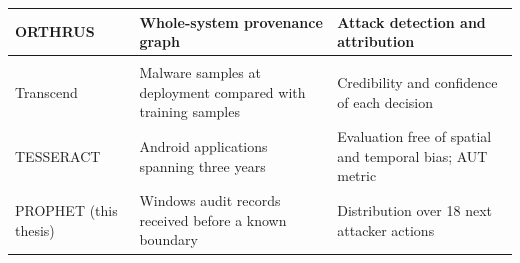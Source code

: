 {\begin{xltabular}{\textwidth}{@{}>{\raggedright\arraybackslash}p{0.22\textwidth}>{\raggedright\arraybackslash}X>{\raggedright\arraybackslash}X@{}}
ORTHRUS~\cite{jiang2025orthrus}
 & Whole-system provenance graph
  & Attack detection and attribution \\
\midrule
{} \\
Transcend~\cite{jordaney2017transcend}
 & Malware samples at deployment compared with training samples
 & Credibility and confidence of each decision \\
TESSERACT~\cite{pendlebury2019tesseract}
 & Android applications spanning three years
 & Evaluation free of spatial and temporal bias; AUT metric \\
\midrule
PROPHET (this thesis)
 & Windows audit records received before a known boundary
 & Distribution over 18 next attacker actions \\
\end{xltabular}}

